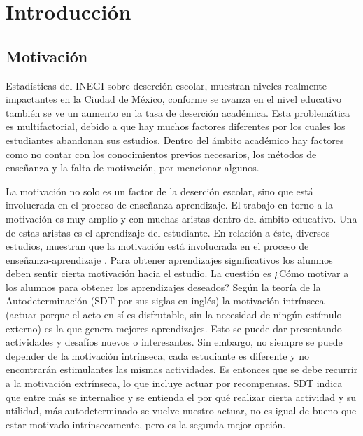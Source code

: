 \documentclass{article}
\begin{document}

\tableofcontents
\section{Introducción}
\subsection{Motivación}
Estadísticas del INEGI sobre deserción escolar, muestran niveles realmente impactantes en la Ciudad de México, conforme se avanza en el nivel educativo también se ve un aumento en la tasa de deserción académica. Esta problemática es multifactorial, debido a que hay muchos factores diferentes por los cuales los estudiantes abandonan sus estudios. Dentro del ámbito académico hay factores como no contar con los conocimientos previos necesarios, los métodos de enseñanza y la falta de motivación, por mencionar algunos. 

La motivación no solo es un factor de la deserción escolar, sino que está involucrada en el proceso de enseñanza-aprendizaje. El trabajo en torno a la motivación es muy amplio y con muchas aristas dentro del ámbito educativo. Una de estas aristas es el aprendizaje del estudiante. En relación a éste, diversos estudios, muestran que la motivación está involucrada en el proceso de enseñanza-aprendizaje \cite{MISBAH201579} \cite{2Mot}. Para obtener aprendizajes significativos los alumnos deben sentir cierta motivación hacia el estudio. La cuestión es ¿Cómo motivar a los alumnos para obtener los aprendizajes deseados? Según la teoría de la Autodeterminación (SDT por sus siglas en inglés) la motivación intrínseca (actuar porque el acto en sí es disfrutable, sin la necesidad de ningún estímulo externo) es la que genera mejores aprendizajes. Esto se puede dar presentando actividades y desafíos nuevos o interesantes. Sin embargo, no siempre se puede depender de la motivación intrínseca, cada estudiante es diferente y no encontrarán estimulantes las mismas actividades. Es entonces que se debe recurrir a la motivación extrínseca, lo que incluye actuar por recompensas. SDT indica que entre más se internalice y se entienda el por qué realizar cierta actividad y su utilidad, más autodeterminado se vuelve nuestro actuar, no es igual de bueno que estar motivado intrínsecamente, pero es la segunda mejor opción. 
\end{document}
